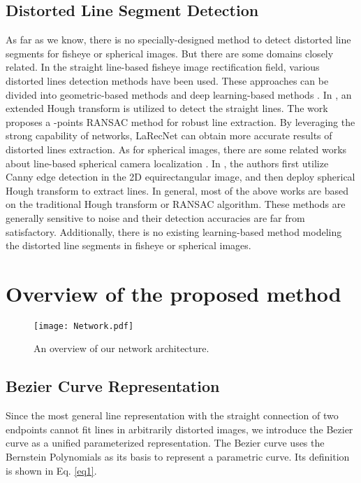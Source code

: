 \documentclass[letterpaper, 10 pt, conference]{ieeeconf}
\begin{document}
\subsection{Distorted Line Segment Detection} \label{sec2-2}
As far as we know, there is no specially-designed method to detect distorted line segments for fisheye or spherical images. But there are some domains closely related. In the straight line-based fisheye image rectification field, various distorted lines detection methods have been used. These approaches can be divided into geometric-based methods \cite{FisheyeRectification1, FisheyeRectification2} and deep learning-based  methods \cite{FisheyeRectification3}. In \cite{FisheyeRectification1}, an extended Hough transform is utilized to detect the straight lines. The work \cite{FisheyeRectification2} proposes a -points RANSAC method for robust line extraction. By leveraging the strong capability of networks, LaRecNet \cite{FisheyeRectification3} can obtain more accurate results of distorted lines extraction. As for spherical images, there are some related works about line-based spherical camera localization \cite{IndoorLocalization1, IndoorLocalization2}. In \cite{IndoorLocalization2}, the authors first utilize Canny edge detection in the 2D equirectangular image, and then deploy spherical Hough transform to extract lines. In general, most of the above works are based on the traditional Hough transform or RANSAC algorithm. These methods are generally sensitive to noise and their detection accuracies are far from satisfactory. Additionally, there is no existing learning-based method modeling the distorted line segments in fisheye or spherical images. 

\section{Overview of the proposed method} \label{sec3}

\begin{figure}[t]
	\begin{center}
		\texttt{[image: Network.pdf]}
	\end{center}
	\caption{An overview of our network architecture.}
	\label{fig:2}
\end{figure}

\subsection{Bezier Curve Representation} \label{sec3-1}
Since the most general line representation with the straight connection of two endpoints cannot fit lines in arbitrarily distorted images, we introduce the Bezier curve as a unified parameterized representation. The Bezier curve uses the Bernstein Polynomials as its basis to represent a parametric curve. Its definition is shown in Eq. \ref{eq1}.
\end{document}
